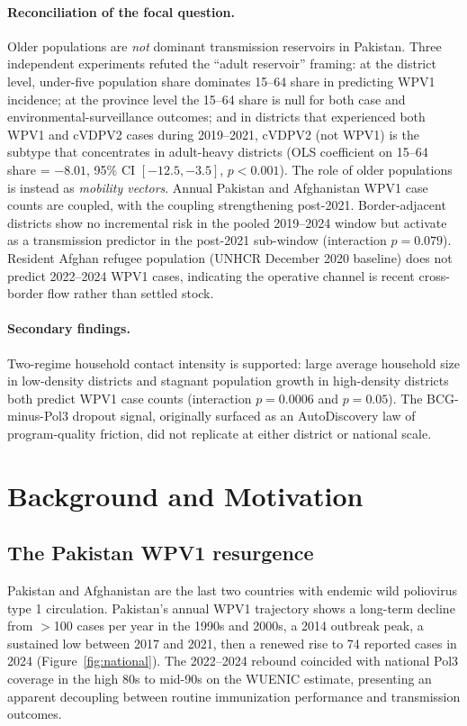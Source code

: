 \documentclass[11pt]{article}
\begin{document}
\paragraph{Reconciliation of the focal question.} Older populations are \emph{not} dominant transmission reservoirs in Pakistan. Three independent experiments refuted the ``adult reservoir'' framing: at the district level, under-five population share dominates 15--64 share in predicting WPV1 incidence; at the province level the 15--64 share is null for both case and environmental-surveillance outcomes; and in districts that experienced both WPV1 and cVDPV2 cases during 2019--2021, cVDPV2 (not WPV1) is the subtype that concentrates in adult-heavy districts (OLS coefficient on 15--64 share = $-8.01$, 95\% CI $[-12.5, -3.5]$, $p<0.001$). The role of older populations is instead as \emph{mobility vectors}. Annual Pakistan and Afghanistan WPV1 case counts are coupled, with the coupling strengthening post-2021. Border-adjacent districts show no incremental risk in the pooled 2019--2024 window but activate as a transmission predictor in the post-2021 sub-window (interaction $p{=}0.079$). Resident Afghan refugee population (UNHCR December 2020 baseline) does not predict 2022--2024 WPV1 cases, indicating the operative channel is recent cross-border flow rather than settled stock.

\paragraph{Secondary findings.} Two-regime household contact intensity is supported: large average household size in low-density districts and stagnant population growth in high-density districts both predict WPV1 case counts (interaction $p{=}0.0006$ and $p{=}0.05$). The BCG-minus-Pol3 dropout signal, originally surfaced as an AutoDiscovery law of program-quality friction, did not replicate at either district or national scale.

\section{Background and Motivation}

\subsection{The Pakistan WPV1 resurgence}

Pakistan and Afghanistan are the last two countries with endemic wild poliovirus type 1 circulation. Pakistan's annual WPV1 trajectory shows a long-term decline from $>$100 cases per year in the 1990s and 2000s, a 2014 outbreak peak, a sustained low between 2017 and 2021, then a renewed rise to 74 reported cases in 2024 (Figure~\ref{fig:national}). The 2022--2024 rebound coincided with national Pol3 coverage in the high 80s to mid-90s on the WUENIC estimate, presenting an apparent decoupling between routine immunization performance and transmission outcomes.
\end{document}
